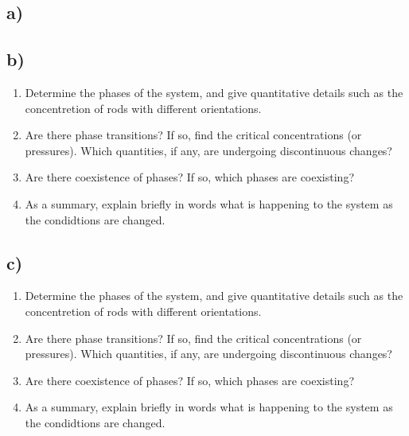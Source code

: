 \subsection*{a)}

\subsection*{b)}
    \begin{enumerate}
        \item Determine the phases of the system, and give  quantitative details such as the concentretion of rods with different orientations. 
        \item Are there phase transitions? If so, find the critical concentrations (or pressures). Which quantities, if any, are undergoing discontinuous changes?
        \item Are there coexistence of phases? If so, which phases are coexisting?
        \item As a summary, explain briefly in words what is happening to the system as the condidtions are changed.
    \end{enumerate}

\subsection*{c)}
    \begin{enumerate}
        \item Determine the phases of the system, and give  quantitative details such as the concentretion of rods with different orientations. 
        \item Are there phase transitions? If so, find the critical concentrations (or pressures). Which quantities, if any, are undergoing discontinuous changes?
        \item Are there coexistence of phases? If so, which phases are coexisting?
        \item As a summary, explain briefly in words what is happening to the system as the condidtions are changed.
    \end{enumerate}
